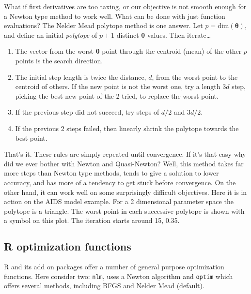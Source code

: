 \documentclass[10pt] {article}
\newcommand{\eps}[3]
{{\begin{center}
 \rotatebox{#1}{\scalebox{#2}{\texttt{[image: \#3]}}}
 \end{center}}
}
\theoremstyle{definition}
\begin{document}
What if first derivatives are too taxing, or our objective is not smooth enough for a Newton type method to work well. What can be done with just function evaluations? The Nelder Mead polytope method is one answer. Let $p = \text{dim}({\bm \theta})$, and define an initial  {\em polytope} of $p+1$ distinct $\bm \theta$ values.
Then iterate\ldots
\begin{enumerate}
\item The vector from the worst $\bm \theta$ point through the centroid (mean) of the other $p$ points is the search direction.
\item The initial step length is twice the distance, $d$, from the worst point to the centroid of others. If the new point is not the worst one, try a length $3d$ step, picking the best new point of the 2 tried, to replace the worst point.
\item If the previous step did not succeed, try steps of $d/2$ and $3d/2$.
\item If the previous 2 steps failed, then linearly shrink the polytope towards the best point.   
\end{enumerate}
That's it. These rules are simply repeated until convergence. If it's that easy why did we ever bother with Newton and Quasi-Newton? Well, this method takes far more steps than Newton type methods, tends to give a solution to lower accuracy, and has more of a tendency to get stuck before convergence. On the other hand, it can work well on some surprisingly difficult objectives. Here it is in action on the AIDS model example. For a 2 dimensional parameter space the polytope is a triangle. The worst point in each successive polytope is shown with a symbol on this plot. The iteration starts around 15, 0.35. 

\eps{-90}{.4}{polytope-aids.eps}

\subsection{R optimization functions}

R and its add on packages offer a number of general purpose optimization functions. Here consider two: {\tt nlm}, uses a Newton algorithm and {\tt optim} which offers several methods, including BFGS and Nelder Mead (default). 
\end{document}
